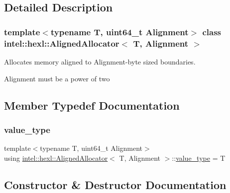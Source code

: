 \subsection{Detailed Description}
\subsubsection*{template$<$typename T, uint64\+\_\+t Alignment$>$\newline
class intel\+::hexl\+::\+Aligned\+Allocator$<$ T, Alignment $>$}

Allocates memory aligned to Alignment-\/byte sized boundaries. 

Alignment must be a power of two 

\subsection{Member Typedef Documentation}
\mbox{\label{classintel_1_1hexl_1_1AlignedAllocator_a8a3b7b0531d253a37a59fe1ffe12ec8a}} 
\subsubsection{\texorpdfstring{value\+\_\+type}{value\_type}}
{\footnotesize\ttfamily template$<$typename T, uint64\+\_\+t Alignment$>$ \\
using \hyperlink{classintel_1_1hexl_1_1AlignedAllocator}{intel\+::hexl\+::\+Aligned\+Allocator}$<$ T, Alignment $>$\+::\hyperlink{classintel_1_1hexl_1_1AlignedAllocator_a8a3b7b0531d253a37a59fe1ffe12ec8a}{value\+\_\+type} =  T}



\subsection{Constructor \& Destructor Documentation}
\mbox{\label{classintel_1_1hexl_1_1AlignedAllocator_afb7109e1c05fc55412ecfdc36894f7e5}} 
